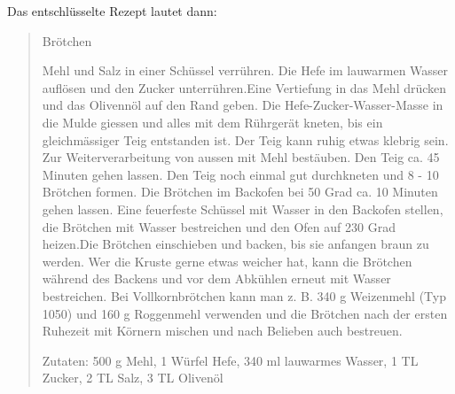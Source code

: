 Das entschlüsselte Rezept lautet dann:

\begin{quote}
 Brötchen

Mehl und Salz in einer Schüssel verrühren. Die Hefe im lauwarmen Wasser auflösen und den Zucker unterrühren.Eine Vertiefung in das Mehl drücken und das Olivennöl auf den Rand geben. Die Hefe-Zucker-Wasser-Masse in die Mulde giessen und alles mit dem Rührgerät kneten, bis ein gleichmässiger Teig entstanden ist. Der Teig kann ruhig etwas klebrig sein. Zur Weiterverarbeitung von aussen mit Mehl bestäuben. Den Teig ca. 45 Minuten gehen lassen. Den Teig noch einmal gut durchkneten und 8 - 10 Brötchen formen. Die Brötchen im Backofen bei 50 Grad ca. 10 Minuten gehen lassen. Eine feuerfeste Schüssel mit Wasser in den Backofen stellen, die Brötchen mit Wasser bestreichen und den Ofen auf 230 Grad heizen.Die Brötchen einschieben und backen, bis sie anfangen braun zu werden. Wer die Kruste gerne etwas weicher hat, kann die Brötchen während des Backens und vor dem Abkühlen erneut mit Wasser bestreichen. Bei Vollkornbrötchen kann man z. B. 340 g Weizenmehl (Typ 1050) und 160 g Roggenmehl verwenden und die Brötchen nach der ersten Ruhezeit mit Körnern mischen und nach Belieben auch bestreuen.

Zutaten: 500 g Mehl, 1 Würfel Hefe, 340 ml lauwarmes Wasser, 1 TL Zucker, 2 TL Salz, 3 TL Olivenöl 
\end{quote}
